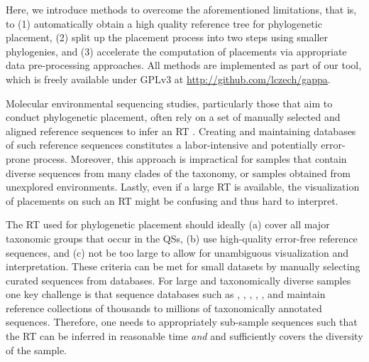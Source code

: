 Here, we introduce methods to overcome the aforementioned limitations, that is, to
(1) automatically obtain a high quality reference tree for phylogenetic placement,
(2) split up the placement process into two steps using smaller phylogenies,
and (3) accelerate the computation of placements via appropriate data pre-processing approaches.
All methods are implemented as part of our  tool,
which is freely available under GPLv3 at \url{http://github.com/lczech/gappa}.

Molecular environmental sequencing studies, particularly those that aim to conduct phylogenetic placement,
often rely on a set of manually selected and aligned reference sequences
to infer an \ac{RT} \cite{Tedersoo2014,DeVargas2015,Mahe2017,Thompson2017}. %
Creating and maintaining databases of such reference sequences constitutes a labor-intensive and potentially error-prone process.
Moreover, this approach is impractical for samples that contain diverse sequences from many clades of the taxonomy,
or samples obtained from unexplored environments.
Lastly, even if a large \ac{RT} is available,
the visualization of placements on such an \ac{RT} might be confusing and thus hard to interpret.

The \acf{RT} used for phylogenetic placement should ideally
(a) cover all major taxonomic groups that occur in the \acp{QS},
(b) use high-quality error-free reference sequences, and
(c) not be too large to allow for unambiguous visualization and interpretation.
These criteria can be met for small datasets by manually selecting curated sequences from databases.
For large and taxonomically diverse samples one key challenge is that sequence databases such as
 \cite{DeSantis2006},  \cite{Abarenkov2010},  \cite{Guillou2012},
 \cite{Kim2012},  \cite{Quast2013}, and  \cite{Cole2014}
maintain reference collections of thousands to millions of taxonomically annotated sequences.
Therefore, one needs to appropriately sub-sample sequences such that the \ac{RT}
can be inferred in reasonable time {\em and} and sufficiently covers the diversity of the sample.

